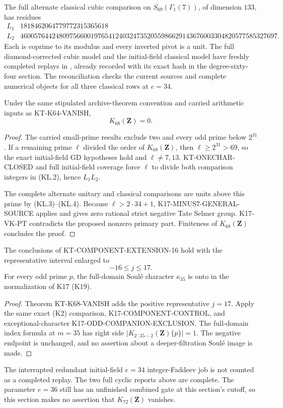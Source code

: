 The full alternate classical cubic comparison on
$S_{69}(\Gamma_1(7))$, of dimension $133$, has residues
\[
\begin{array}{c|r}
 L_1&1818462064779772315365618\\
 L_2&4600576442480975660019765412403247352055986629143676003304820577585327697.
\end{array}                                                    \tag{KL.4}
\]
Each is coprime to its modulus and every inverted pivot is a
unit.  The full diamond-corrected cubic model and the
initial-field classical model have freshly completed replays
in , already recorded with
its exact hash in the degree-sixty-four section.  The
reconciliation checks the current sources and complete
numerical objects for all three classical rows at $e=34$.

\begin{theorem}[KT-K68-VANISH]
\label{thm:kt-k68-vanish}
Under the same stipulated archive-theorem convention and
carried arithmetic inputs as KT-K64-VANISH,
\[
                              K_{68}(\mathbf Z)=0.
\]
\end{theorem}
\begin{proof}
The carried small-prime results exclude two and every odd
prime below $2^{31}$.  If a remaining prime $\ell$ divided
the order of $K_{68}(\mathbf Z)$, then
$\ell\geq2^{31}>69$, so the exact initial-field GD
hypotheses hold and $\ell\ne7,13$.  KT-ONECHAR-CLOSED
and full initial-field coverage force $\ell$ to divide
both comparison integers in (KL.2), hence $L_1L_2$.

The complete alternate unitary and classical comparisons
are units above this prime by (KL.3)--(KL.4).  Because
$\ell>2\cdot34+1$, K17-MINUS7-GENERAL-SOURCE applies
and gives zero rational strict negative Tate Selmer group.
K17-VK-PT contradicts the proposed nonzero primary part.
Finiteness of $K_{68}(\mathbf Z)$ concludes the proof.
\end{proof}

\begin{corollary}
The conclusions of KT-COMPONENT-EXTENSION-16 hold with
the representative interval enlarged to
\[
                             -16\leq j\leq17.
\]
For every odd prime $p$, the full-domain Soul\'e character
$\kappa_{35}$ is onto in the normalization of K17 (K19).
\end{corollary}
\begin{proof}
Theorem KT-K68-VANISH adds the positive representative
$j=17$.  Apply the same exact (K2) comparison,
K17-COMPONENT-CONTROL, and exceptional-character
K17-ODD-COMPANION-EXCLUSION.  The full-domain index
formula at $m=35$ has right side
$|K_{2\cdot35-2}(\mathbf Z)\{p\}|=1$.
The negative endpoint is unchanged, and no assertion about
a deeper-filtration Soul\'e image is made.
\end{proof}

The interrupted redundant initial-field $e=34$
integer-Faddeev job is not counted as a completed replay.
The two full cyclic reports above are complete.  The
parameter $e=36$ still has an unfinished combined gate at
this section's cutoff, so this section makes no assertion
that $K_{72}(\mathbf Z)$ vanishes.
